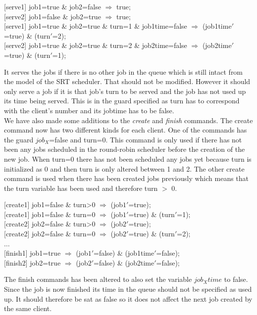 \documentclass[12pt]{report}
\begin{document}
\begin{center}
{[serve1]} job1=true \& job2=false $\Rightarrow$ true;\\
{[serve2]} job1=false \& job2=true $\Rightarrow$ true;\\
{[serve1]} job1=true \& job2=true \& turn=1 \& job1time=false $\Rightarrow$ (job1time$'$=true) \& (turn$'$=2);\\
{[serve2]} job1=true \& job2=true \& turn=2 \& job2time=false $\Rightarrow$ (job2time$'$=true) \& (turn$'$=1);
\end{center}
It serves the jobs if there is no other job in the queue which is still intact from the model of the SRT scheduler. That should not be modified. However it should only serve a job if it is that job's turn to be served and the job has not used up its time being served. This is in the guard specified as turn has to correspond with the client's number and its jobtime has to be false.\\
We have also made some additions to the \emph{create} and \emph{finish} commands. The create command now has two different kinds for each client. One of the commands has the guard $job_X$=false and turn=0. This command is only used if there has not been any jobs scheduled in the round-robin scheduler before the creation of the new job. When turn=0 there has not been scheduled any jobs yet because turn is initialized as 0 and then turn is only altered between 1 and 2. The other create command is used when there has been created jobs previously which means that the turn variable has been used and therefore turn $>$ 0.
\begin{center}
{[create1]} job1=false \& turn>0 $\Rightarrow$ (job$1'$=true);\\
{[create1]} job1=false \& turn=0 $\Rightarrow$ (job$1'$=true) \& (turn$'$=1);\\
{[create2]} job2=false \& turn>0 $\Rightarrow$ (job$2'$=true);\\
{[create2]} job2=false \& turn=0 $\Rightarrow$ (job$2'$=true) \& (turn$'$=2);\\
$\dots$\\
{[finish1]} job1=true $\Rightarrow$ (job$1'$=false) \& (job1time$'$=false);\\
{[finish2]} job2=true $\Rightarrow$ (job$2'$=false) \& (job2time$'$=false);
\end{center}
The finish commands has been altered to also set the variable $job_Xtime$ to false. Since the job is now finished its time in the queue should not be specified as used up. It should therefore be sat as false so it does not affect the next job created by the same client.\\
\end{document}
